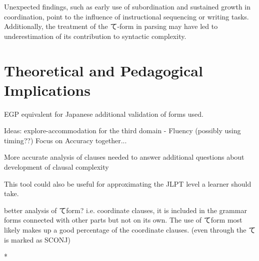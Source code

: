 Unexpected findings, such as early use of subordination and sustained growth in coordination, point to the influence
of instructional sequencing or writing tasks. Additionally, the treatment of the て-form in parsing may have led to
underestimation of its contribution to syntactic complexity.

\section{Theoretical and Pedagogical Implications}




EGP equivalent for Japanese additional validation of forms used.

Ideas: explore-accommodation for the third domain - Fluency (possibly using timing??)  Focus on Accuracy together...

More accurate analysis of clauses needed to answer additional questions about development of clausal complexity

This tool could also be useful for approximating the JLPT level a learner should take.

better analysis of てform? i.e. coordinate clauses, it is included in the grammar forms connected with other parts
but not on its own. The use of てform most likely makes up a good percentage of the coordinate clauses. (even through
the て is marked as SCONJ)


*